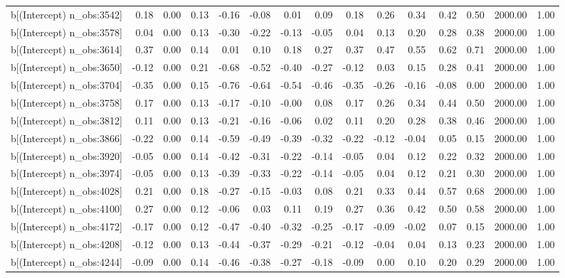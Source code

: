 \begin{table}[ht]
\begin{tabular}{rrrrrrrrrrrrrrr}
  b[(Intercept) n\_obs:3542] & 0.18 & 0.00 & 0.13 & -0.16 & -0.08 & 0.01 & 0.09 & 0.18 & 0.26 & 0.34 & 0.42 & 0.50 & 2000.00 & 1.00 \\ 
  b[(Intercept) n\_obs:3578] & 0.04 & 0.00 & 0.13 & -0.30 & -0.22 & -0.13 & -0.05 & 0.04 & 0.13 & 0.20 & 0.28 & 0.38 & 2000.00 & 1.00 \\ 
  b[(Intercept) n\_obs:3614] & 0.37 & 0.00 & 0.14 & 0.01 & 0.10 & 0.18 & 0.27 & 0.37 & 0.47 & 0.55 & 0.62 & 0.71 & 2000.00 & 1.00 \\ 
  b[(Intercept) n\_obs:3650] & -0.12 & 0.00 & 0.21 & -0.68 & -0.52 & -0.40 & -0.27 & -0.12 & 0.03 & 0.15 & 0.28 & 0.41 & 2000.00 & 1.00 \\ 
  b[(Intercept) n\_obs:3704] & -0.35 & 0.00 & 0.15 & -0.76 & -0.64 & -0.54 & -0.46 & -0.35 & -0.26 & -0.16 & -0.08 & 0.00 & 2000.00 & 1.00 \\ 
  b[(Intercept) n\_obs:3758] & 0.17 & 0.00 & 0.13 & -0.17 & -0.10 & -0.00 & 0.08 & 0.17 & 0.26 & 0.34 & 0.44 & 0.50 & 2000.00 & 1.00 \\ 
  b[(Intercept) n\_obs:3812] & 0.11 & 0.00 & 0.13 & -0.21 & -0.16 & -0.06 & 0.02 & 0.11 & 0.20 & 0.28 & 0.38 & 0.46 & 2000.00 & 1.00 \\ 
  b[(Intercept) n\_obs:3866] & -0.22 & 0.00 & 0.14 & -0.59 & -0.49 & -0.39 & -0.32 & -0.22 & -0.12 & -0.04 & 0.05 & 0.15 & 2000.00 & 1.00 \\ 
  b[(Intercept) n\_obs:3920] & -0.05 & 0.00 & 0.14 & -0.42 & -0.31 & -0.22 & -0.14 & -0.05 & 0.04 & 0.12 & 0.22 & 0.32 & 2000.00 & 1.00 \\ 
  b[(Intercept) n\_obs:3974] & -0.05 & 0.00 & 0.13 & -0.39 & -0.33 & -0.22 & -0.14 & -0.05 & 0.04 & 0.12 & 0.21 & 0.30 & 2000.00 & 1.00 \\ 
  b[(Intercept) n\_obs:4028] & 0.21 & 0.00 & 0.18 & -0.27 & -0.15 & -0.03 & 0.08 & 0.21 & 0.33 & 0.44 & 0.57 & 0.68 & 2000.00 & 1.00 \\ 
  b[(Intercept) n\_obs:4100] & 0.27 & 0.00 & 0.12 & -0.06 & 0.03 & 0.11 & 0.19 & 0.27 & 0.36 & 0.42 & 0.50 & 0.58 & 2000.00 & 1.00 \\ 
  b[(Intercept) n\_obs:4172] & -0.17 & 0.00 & 0.12 & -0.47 & -0.40 & -0.32 & -0.25 & -0.17 & -0.09 & -0.02 & 0.07 & 0.15 & 2000.00 & 1.00 \\ 
  b[(Intercept) n\_obs:4208] & -0.12 & 0.00 & 0.13 & -0.44 & -0.37 & -0.29 & -0.21 & -0.12 & -0.04 & 0.04 & 0.13 & 0.23 & 2000.00 & 1.00 \\ 
  b[(Intercept) n\_obs:4244] & -0.09 & 0.00 & 0.14 & -0.46 & -0.38 & -0.27 & -0.18 & -0.09 & 0.00 & 0.10 & 0.20 & 0.29 & 2000.00 & 1.00 \\ 

\end{tabular}
\end{table}
